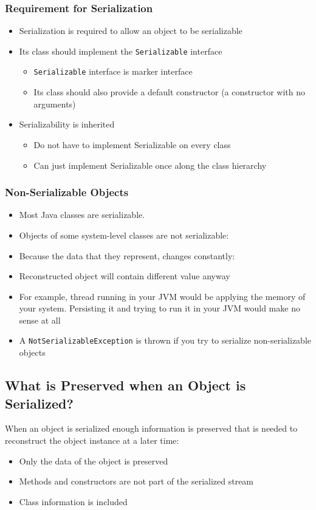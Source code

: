 \documentclass[11pt,a4paper]{article}
\begin{document}
\subsubsection*{Requirement for Serialization}
\begin{itemize}
    \item Serialization is required to allow an object to be serializable 
    \item Its class should implement the \texttt{Serializable} interface
        \begin{itemize}
            \item \texttt{Serializable} interface is marker interface
            \item Its class should also provide a default constructor (a constructor with no arguments) 
        \end{itemize}
    \item Serializability is inherited 
        \begin{itemize}
            \item Do not have to implement Serializable on every class 
            \item Can just implement Serializable once along the class hierarchy 
        \end{itemize}
\end{itemize}

\subsubsection*{Non-Serializable Objects}
\begin{itemize}
    \item Most Java classes are serializable. 
    \item Objects of some system-level classes are not serializable: 
    \item Because the data that they represent, changes constantly: 
    \item Reconstructed object will contain different value anyway 
    \item For example, thread running in your JVM would be applying the memory of your system. Persisting it and trying to run it in your JVM would make no sense at all
    \item A \texttt{NotSerializableException} is thrown if you try to serialize non-serializable objects
\end{itemize}

\subsection*{What is Preserved when an Object is Serialized?}
When an object is serialized enough information is preserved that is needed to reconstruct the object instance at a later time:
\begin{itemize}
    \item Only the data of the object is preserved 
    \item Methods and constructors are not part of the serialized stream 
    \item Class information is included 
\end{itemize}
\end{document}
